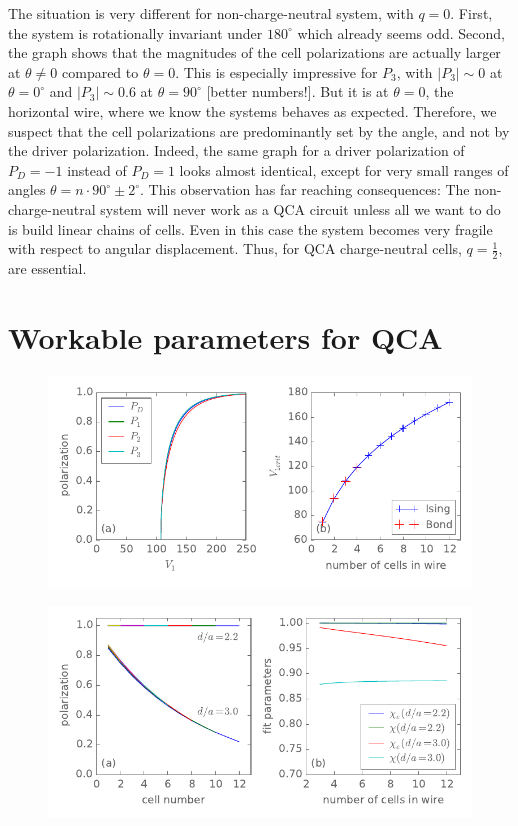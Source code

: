 The situation is very different for non-charge-neutral system, with $q=0$.
First, the system is rotationally invariant under $180^{\circ}$ which already
seems odd. Second, the graph shows that the magnitudes of the cell polarizations
are actually larger at $\theta \ne 0$ compared to $\theta = 0$. This is
especially impressive for $P_3$, with $|P_3| \sim 0$ at $\theta=0^{\circ}$ and
$|P_3| \sim 0.6$ at $\theta = 90^{\circ}$ {[}better numbers!{]}. But it is at
$\theta = 0$, the horizontal wire, where we know the systems behaves as
expected.  Therefore, we suspect that the cell polarizations are predominantly
set by the angle, and not by the driver polarization. Indeed, the same graph for
a driver polarization of $P_D = -1$ instead of $P_D = 1$ looks almost identical,
except for very small ranges of angles $\theta = n \cdot 90^{\circ} \pm
2^{\circ}$. This observation has far reaching consequences: The
non-charge-neutral system will never work as a QCA circuit unless all we want to
do is build linear chains of cells.  Even in this case the system becomes very
fragile with respect to angular displacement. Thus, for QCA charge-neutral
cells, $q=\frac{1}{2}$, are essential.


\section{Workable parameters for QCA}

%
\begin{figure}
  \center
  \includegraphics{critical_V1}
  \caption{
  }
  \label{fig:critical_V1}
\end{figure}
%

%
\begin{figure}
  \center
  \includegraphics{wire_polarization}
  \caption{
  }
  \label{fig:wire_polarization}
\end{figure}
%
